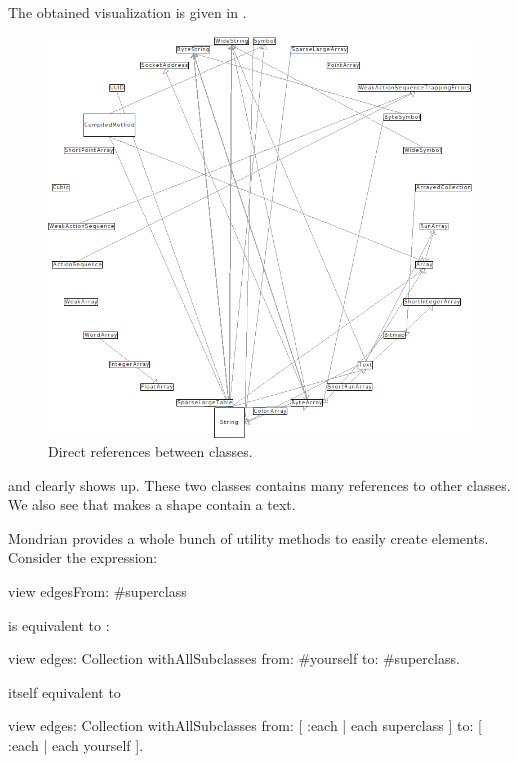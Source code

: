 \documentclass[a4paper,10pt,twoside]{book}
\begin{document}
The obtained visualization is given in .

\begin{figure}[htbp]
\centerline{\includegraphics[width=\linewidth]{classDependencies}}
\caption{Direct references between classes.}
\label{fig:classDependencies}
\end{figure}

 and  clearly shows up. These two classes contains many references to other classes.
We also see that  makes a shape contain a text.

Mondrian provides a whole bunch of utility methods to easily create elements.  Consider the expression:
\begin{code}{}
view edgesFrom: #superclass
\end{code}

 is equivalent to  :

\begin{code}{}
view edges: Collection withAllSubclasses from: #yourself to: #superclass.
\end{code}

itself equivalent to
\begin{code}{}
view 
  edges: Collection withAllSubclasses 
  from: [ :each | each superclass ] 
  to: [ :each | each yourself ].
\end{code}
\end{document}
